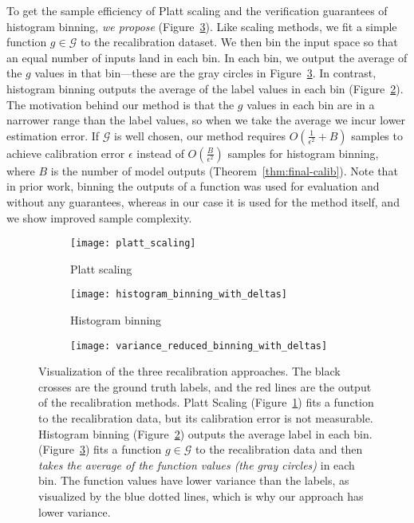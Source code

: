 To get the sample efficiency of Platt scaling and the verification guarantees of histogram binning, \emph{we propose \ourcal{}} (Figure~\ref{fig:var_red_binning}).
Like scaling methods, we fit a simple function $g \in \mathcal{G}$ to the recalibration dataset.
We then bin the input space so that an equal number of inputs land in each bin.
In each bin, we output the average of the $g$ values in that bin---these are the gray circles in Figure~\ref{fig:var_red_binning}.
In contrast, histogram binning outputs the average of the label values in each bin (Figure~\ref{fig:hist_binning}).
The motivation behind our method is that the $g$ values in each bin are in a narrower range than the label values, so when we take the average we incur lower estimation error.
If $\mathcal{G}$ is well chosen, our method requires $O(\frac{1}{\epsilon^2} + B)$ samples to achieve calibration error $\epsilon$ instead of $O(\frac{B}{\epsilon^2})$ samples for histogram binning, where $B$ is the number of model outputs (Theorem~\ref{thm:final-calib}). Note that in prior work, binning the outputs of a function was used for evaluation and without any guarantees, whereas in our case it is used for the method itself, and we show improved sample complexity.

\begin{figure}
     \centering
     \begin{subfigure}[b]{0.32\textwidth}
         \centering
         \texttt{[image: platt\_scaling]}
         \caption{Platt scaling}
         \label{fig:platt_scaling}
     \end{subfigure}
     \hfill
     \begin{subfigure}[b]{0.32\textwidth}
         \centering
         \texttt{[image: histogram\_binning\_with\_deltas]}
         \caption{Histogram binning}
         \label{fig:hist_binning}
     \end{subfigure}
     \hfill
     \begin{subfigure}[b]{0.32\textwidth}
         \centering
         \texttt{[image: variance\_reduced\_binning\_with\_deltas]}
         \caption{\Ourcalnothe{}}
         \label{fig:var_red_binning}
     \end{subfigure}
        \caption{
        Visualization of the three recalibration approaches.
        The black crosses are the ground truth labels, and the red lines are the output of the recalibration methods.
        Platt Scaling (Figure~\ref{fig:platt_scaling}) fits a function to the recalibration data, but its calibration error is not measurable.
        Histogram binning (Figure~\ref{fig:hist_binning}) outputs the average label in each bin.
        \Ourcal{} (Figure~\ref{fig:var_red_binning}) fits a function $g \in \mathcal{G}$ to the recalibration data and then \emph{takes the average of the function values (the gray circles)} in each bin.
        The function values have lower variance than the labels, as visualized by the blue dotted lines, which is why our approach has lower variance.
        }
        \label{fig:variance_reduced_illustration}
\end{figure}

